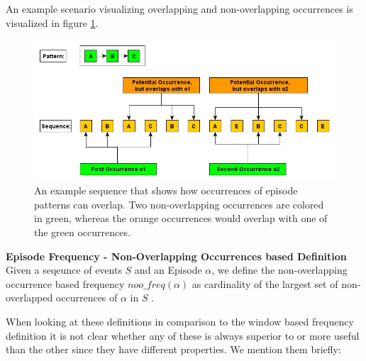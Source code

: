 An example scenario visualizing overlapping and non-overlapping occurrences is visualized in figure \ref{fig_nonOverlappingExample}.


\begin{figure}[h]
	\centering
  	\includegraphics[width=\textwidth]{nonOverlappingExample}
	\caption{An example sequence that shows how occurrences of episode patterns can overlap. Two non-overlapping occurrences are colored in green, whereas the orange occurrences would overlap with one of the green occurrences.}
	\label{fig_nonOverlappingExample}
\end{figure}

\begin{mydef}
\label{def_nonOverlappingFrequency}
\textbf{Episode Frequency - Non-Overlapping Occurrences based Definition} Given a seqeunce of events $S$ and an Episode $\alpha$, we define the non-overlapping occurrence based frequency $noo\_freq(\alpha )$ as cardinality of the largest set of non-overlapped occurrences of $\alpha$ in $S$ \cite{laxman2007fast}.
\end{mydef}


When looking at these definitions in comparison to the window based frequency definition it is not clear whether any of these is always superior to or more useful than the other since they have different properties. We mention them briefly:

